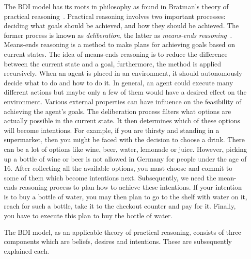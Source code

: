 The BDI model has its roots in philosophy as found in Bratman's theory of practical reasoning~\cite{Sebastian_Hierarchical_2006}.
Practical reasoning involves two important processes: deciding what goals should be achieved, and how they should be achieved.
The former process is known as \emph{deliberation}, the latter as \emph{means-ends reasoning}~\cite{Gerhard_MultiSystem_1999}.
Means-ends reasoning is a method to make plans for achieving goals based on current states.
The idea of means-ends reasoning is to reduce the difference between the current state and a goal, furthermore, the method is applied recursively.
When an agent is placed in an environment, it should autonomously decide what to do and how to do it.
In general, an agent could execute many different actions but maybe only a few of them would have a desired effect on the environment.
Various external properties can have influence on the feasibility of achieving the agent's goals.
The deliberation process filters what options are actually possible in the current state.
It then determines which of these options will become intentions.
For example, if you are thirsty and standing in a supermarket, then you might be faced with the decision to choose a drink.
There can be a lot of options like wine, beer, water, lemonade or juice.
However, picking up a bottle of wine or beer is not allowed in Germany for people under the age of 16. %
After collecting all the available options, you must choose and commit to some of them which become intentions next.
Subsequently, we need the mean-ends reasoning process to plan how to achieve these intentions.
If your intention is to buy a bottle of water, you may then plan to go to the shelf with water on it, reach for such a bottle, take it to the checkout counter and pay for it.
Finally, you have to execute this plan to buy the bottle of water.

The BDI model, as an applicable theory of practical reasoning, consists of three components which are beliefs, desires and intentions.
These are subsequently explained each.

